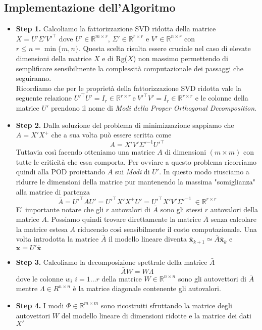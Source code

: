 \documentclass[11pt]{article}
\newcommand{\R}{\mathbb{R}}
\begin{document}
\subsection{Implementazione dell'Algoritmo}
\begin{itemize}
\item \textbf{Step 1.}
Calcoliamo la fattorizzazione SVD ridotta della matrice $X=U'\Sigma' V'^\top$ dove $U' \in \R^{m \times r}$, $\Sigma' \in \R^{r \times r}$ e $V' \in \R^{n \times r}$ con $r \leq n = \min{\{m,n\}} $.  Questa scelta risulta essere cruciale  nel caso di elevate dimensioni della matrice $X$ e di Rg($X$) non massimo permettendo di semplificare sensibilmente la complessità computazionale dei passaggi che seguiranno. \\
Ricordiamo che per le proprietà della fattorizzazione SVD ridotta vale la seguente relazione $U'^\top U' = I_r \in \R^{r \times r} \ \text{e} \ V'^\top V' = I_r \in \R^{r \times r} $ e le colonne della matrice $U'$ prendono il nome di \textit{Modi della Proper Orthogonal Decomposition}. 
\item \textbf{Step 2.}
Dalla soluzione del problema di minimizzazione sappiamo che $A=X'X^+$ che a sua volta può essere scritta come $$A=X'V'\Sigma'^{-1}U'^\top$$
Tuttavia così facendo otteniamo una matrice $A$ di dimensioni \((m \times m ) \) con tutte le criticità che essa comporta. Per ovviare a questo problema ricorriamo quindi alla POD proiettando  $A$ sui \textit{Modi} di \(U'\). In questo modo riusciamo a ridurre le dimensioni della matrice pur mantenendo la massima "somiglianza" alla matrice di partenza   
$$\bar{A}=U'^\top A U' = U'^\top X' X^+ U'= U'^\top X' V' \Sigma'^{-1} \ \in \R^{r \times r}$$
E' importante notare che gli $r$ autovalori di $\bar{A}$ sono gli stessi $r$ autovalori della matrice $A$. 
Possiamo quindi trovare direttamente la matrice $\bar{A}$ senza calcolare la matrice estesa $A$ riducendo così sensibilmente il costo computazionale. Una volta introdotta la matrice $\bar{A}$ il modello lineare diventa $\mathbf{\bar{x}}_{k+1} \simeq \bar{A} \mathbf{\bar{x}}_k $ e $\mathbf{x}=U' \mathbf{\bar{x}}$
\item \textbf{Step 3.}
Calcoliamo la decomposizione spettrale della matrice $\bar{A}$  $$\bar{A} W = W \Lambda$$
dove le colonne $w_i$ $i = 1 \dots r$ della matrice $W \in \R^{n \times n}$ sono gli autovettori di $\bar{A}$ mentre $\Lambda \in R^{n \times n}$ è la matrice diagonale contenente gli autovalori.
\item \textbf{Step 4.}
I modi $\Phi \in \R^{m \times m}$ sono ricostruiti sfruttando la matrice degli autovettori $W$ del modello lineare di dimensioni ridotte e la matrice dei dati $X'$

\end{itemize}
\end{document}
